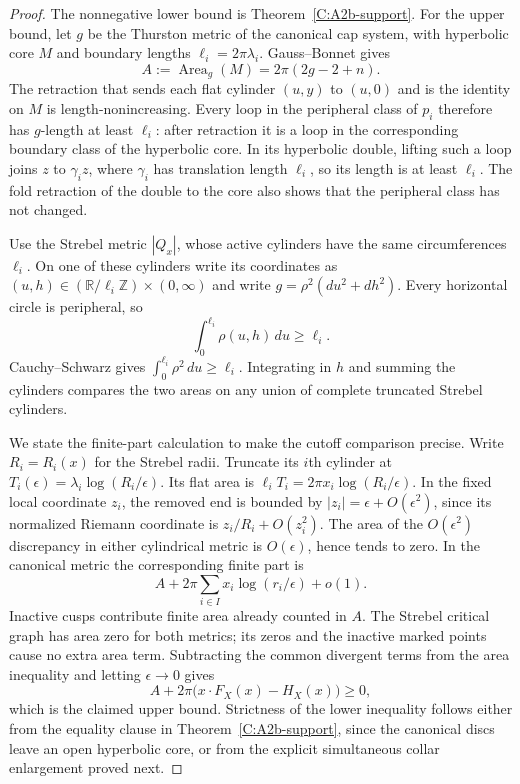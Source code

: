 \begin{proof}
The nonnegative lower bound is Theorem~\ref{C:A2b-support}. For the upper bound, let $g$ be the Thurston metric of the canonical cap system, with hyperbolic core $M$ and boundary lengths $\ell_i=2\pi\lambda_i$. Gauss--Bonnet gives
\[
 A:=\operatorname{Area}_g(M)=2\pi(2g-2+n).
\]
The retraction that sends each flat cylinder $(u,y)$ to $(u,0)$ and is the identity on $M$ is length-nonincreasing. Every loop in the peripheral class of $p_i$ therefore has $g$-length at least $\ell_i$: after retraction it is a loop in the corresponding boundary class of the hyperbolic core. In its hyperbolic double, lifting such a loop joins $z$ to $\gamma_i z$, where $\gamma_i$ has translation length $\ell_i$, so its length is at least $\ell_i$. The fold retraction of the double to the core also shows that the peripheral class has not changed.

Use the Strebel metric $|Q_x|$, whose active cylinders have the same circumferences $\ell_i$. On one of these cylinders write its coordinates as
$(u,h)\in(\mathbb R/\ell_i\mathbb Z)\times(0,\infty)$ and write $g=\rho^2(du^2+dh^2)$. Every horizontal circle is peripheral, so
\[
 \int_0^{\ell_i}\rho(u,h)\,du\geq\ell_i.
\]
Cauchy--Schwarz gives $\int_0^{\ell_i}\rho^2\,du\geq\ell_i$. Integrating in $h$ and summing the cylinders compares the two areas on any union of complete truncated Strebel cylinders.

We state the finite-part calculation to make the cutoff comparison precise. Write $R_i=R_i(x)$ for the Strebel radii. Truncate its $i$th cylinder at
$T_i(\epsilon)=\lambda_i\log(R_i/\epsilon)$. Its flat area is
$\ell_iT_i=2\pi x_i\log(R_i/\epsilon)$. In the fixed local coordinate $z_i$, the removed end is bounded by
$|z_i|=\epsilon+O(\epsilon^2)$, since its normalized Riemann coordinate is $z_i/R_i+O(z_i^2)$. The area of the $O(\epsilon^2)$ discrepancy in either cylindrical metric is $O(\epsilon)$, hence tends to zero. In the canonical metric the corresponding finite part is
\[
 A+2\pi\sum_{i\in I}x_i\log(r_i/\epsilon)+o(1).
\]
Inactive cusps contribute finite area already counted in $A$. The Strebel critical graph has area zero for both metrics; its zeros and the inactive marked points cause no extra area term. Subtracting the common divergent terms from the area inequality and letting $\epsilon\to0$ gives
\[
 A+2\pi\bigl(x\cdot F_X(x)-H_X(x)\bigr)\geq0,
\]
which is the claimed upper bound. Strictness of the lower inequality follows either from the equality clause in Theorem~\ref{C:A2b-support}, since the canonical discs leave an open hyperbolic core, or from the explicit simultaneous collar enlargement proved next.
\end{proof}

